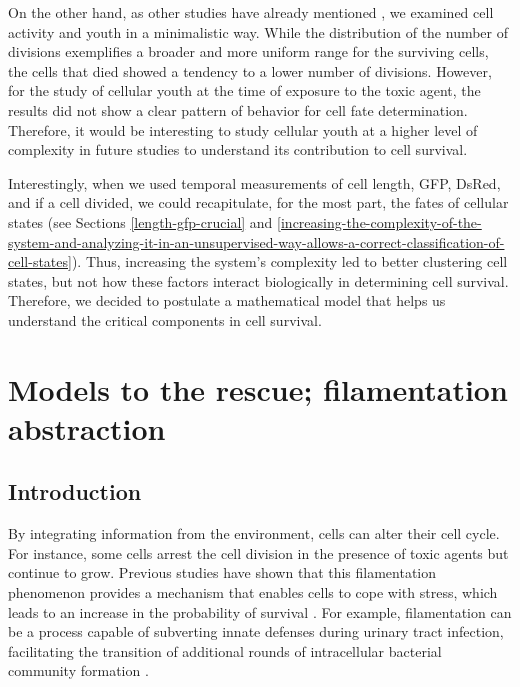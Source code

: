 \documentclass[
  12pt,
  a4paper,
  oneside]{krantz}
\begin{document}
On the other hand, as other studies have already mentioned
\citep{heinrich2015, wang2009}, we examined cell activity and youth in a
minimalistic way. While the distribution of the number of divisions
exemplifies a broader and more uniform range for the surviving cells,
the cells that died showed a tendency to a lower number of divisions.
However, for the study of cellular youth at the time of exposure to the
toxic agent, the results did not show a clear pattern of behavior for
cell fate determination. Therefore, it would be interesting to study
cellular youth at a higher level of complexity in future studies to
understand its contribution to cell survival.

Interestingly, when we used temporal measurements of cell length, GFP,
DsRed, and if a cell divided, we could recapitulate, for the most part,
the fates of cellular states (see Sections \ref{length-gfp-crucial} and
\ref{increasing-the-complexity-of-the-system-and-analyzing-it-in-an-unsupervised-way-allows-a-correct-classification-of-cell-states}).
Thus, increasing the system's complexity led to better clustering cell
states, but not how these factors interact biologically in determining
cell survival. Therefore, we decided to postulate a mathematical model
that helps us understand the critical components in cell survival.

\hypertarget{model-analysis}{%
\chapter{Models to the rescue; filamentation abstraction}\label{model-analysis}}

\hypertarget{introduction-3}{%
\section{Introduction}\label{introduction-3}}

By integrating information from the environment, cells can alter their
cell cycle. For instance, some cells arrest the cell division in the
presence of toxic agents but continue to grow. Previous studies have
shown that this filamentation phenomenon provides a mechanism that
enables cells to cope with stress, which leads to an increase in the
probability of survival \citep{justiceMorphologicalPlasticityBacterial2008}.
For example, filamentation can be a process capable of subverting innate
defenses during urinary tract infection, facilitating the transition of
additional rounds of intracellular bacterial community formation
\citep{justiceFilamentationEscherichiaColi2006}.
\end{document}
